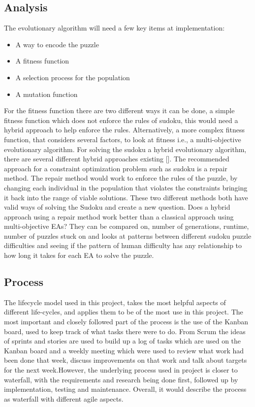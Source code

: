 \documentclass[a4paper,11pt]{article}
\begin{document}
\subsection{Analysis}
The evolutionary algorithm will need a few key items at implementation:
\begin{itemize}
	\item A way to encode the puzzle
	\item A fitness function
	\item A selection process for the population
	\item A mutation function
\end{itemize}
For the fitness function there are two different ways it can be done, a simple fitness function which does not enforce the rules of sudoku, this would need a hybrid approach to help enforce the rules. Alternatively, a more complex fitness function, that considers several factors, to look at fitness i.e., a multi-objective evolutionary algorithm.\newline \newline
For solving the sudoku a hybrid evolutionary algorithm, there are several different hybrid approaches existing []. The recommended approach for a constraint optimization problem such as sudoku is a repair method. The repair method would work to enforce the rules of the puzzle, by changing each individual in the population that violates the constraints bringing it back into the range of viable solutions.\newline \newline
These two different methods both have valid ways of solving the Sudoku and create a new question. Does a hybrid approach using a repair method work better than a classical approach using multi-objective EAs? They can be compared on, number of generations, runtime, number of puzzles stuck on and looks at patterns between different sudoku puzzle difficulties and seeing if the pattern of human difficulty has any relationship to how long it takes for each EA to solve the puzzle.

\subsection{Process}
The lifecycle model used in this project, takes the most helpful aspects of different life-cycles, and applies them to be of the most use in this project. The most important and closely followed part of the process is the use of the Kanban board, used to keep track of what tasks there were to do. From Scrum the ideas of sprints and stories are used to build up a log of tasks which are used on the Kanban board and a weekly meeting which were used to review what work had been done that week, discuss improvements on that work and talk about targets for the next week.\newline \newline However, the underlying process used in project is closer to waterfall, with the requirements and research being done first, followed up by implementation, testing and maintenance. Overall, it would describe the process as waterfall with different agile aspects.
\end{document}
